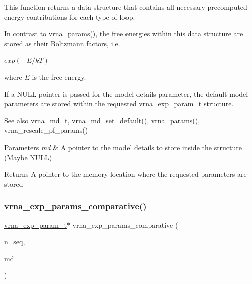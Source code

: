 This function returns a data structure that contains all necessary precomputed energy contributions for each type of loop.

In contrast to \hyperlink{group__energy__parameters_gad0e3e7e74bdc50d1709d40c92993185e}{vrna\+\_\+params()}, the free energies within this data structure are stored as their Boltzmann factors, i.\+e.

$ exp(-E / kT) $

where $ E $ is the free energy.

If a N\+U\+LL pointer is passed for the model details parameter, the default model parameters are stored within the requested \hyperlink{group__energy__parameters_ga01d8b92fe734df8d79a6169482c7d8d8}{vrna\+\_\+exp\+\_\+param\+\_\+t} structure.

\begin{DoxySeeAlso}{See also}
\hyperlink{group__model__details_ga1f8a10e12a0a1915f2a4eff0b28ea17c}{vrna\+\_\+md\+\_\+t}, \hyperlink{group__model__details_ga8ac6ff84936282436f822644bf841f66}{vrna\+\_\+md\+\_\+set\+\_\+default()}, \hyperlink{group__energy__parameters_gad0e3e7e74bdc50d1709d40c92993185e}{vrna\+\_\+params()}, vrna\+\_\+rescale\+\_\+pf\+\_\+params()
\end{DoxySeeAlso}

\begin{DoxyParams}{Parameters}
{\em md} & A pointer to the model details to store inside the structure (Maybe N\+U\+LL) \\
\hline
\end{DoxyParams}
\begin{DoxyReturn}{Returns}
A pointer to the memory location where the requested parameters are stored 
\end{DoxyReturn}
\mbox{\label{group__energy__parameters_gaf78c09e685e6eef4100b1a41d4042550}} 
\subsubsection{\texorpdfstring{vrna\+\_\+exp\+\_\+params\+\_\+comparative()}{vrna\_exp\_params\_comparative()}}
{\footnotesize\ttfamily \hyperlink{group__energy__parameters_ga01d8b92fe734df8d79a6169482c7d8d8}{vrna\+\_\+exp\+\_\+param\+\_\+t}$\ast$ vrna\+\_\+exp\+\_\+params\+\_\+comparative (\begin{DoxyParamCaption}\item[{unsigned int}]{n\+\_\+seq,  }\item[{\hyperlink{group__model__details_ga1f8a10e12a0a1915f2a4eff0b28ea17c}{vrna\+\_\+md\+\_\+t} $\ast$}]{md }\end{DoxyParamCaption})}



